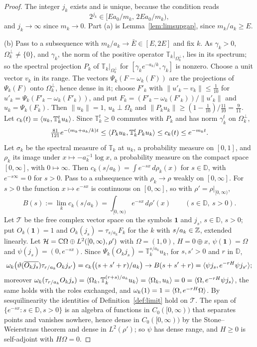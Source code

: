 \begin{proof}
The integer $j_k$ exists and is unique, because the condition reads
\[
2^{j_k}\in[Ea_0/m_k,\,2Ea_0/m_k),
\]
and $j_k\to\infty$ since $m_k\to0$. Part (a) is
Lemma~\ref{lem:limsupgap}, since $m_k/a_k\ge E$.

(b) Pass to a subsequence with $m_k/a_k\to\bar E\in[E,2E]$ and fix $k$. As
$\gamma_k>0$, $\Omega_k^\perp\ne\{0\}$, and $\gamma_k$, the norm of the positive
operator $\mathbb T_k|_{\Omega_k^\perp}$, lies in its spectrum; so the spectral
projection $P_k$ of $\mathbb T_k|_{\Omega_k^\perp}$ for $[\gamma_ke^{-a_k/k},
\gamma_k]$ is nonzero. Choose a unit vector $v_k$ in its range. The vectors
$\Psi_k(F-\omega_k(F))$ are the projections of $\Psi_k(F)$ onto $\Omega_k^\perp$,
hence dense in it; choose $F'_k$ with $\|u'_k-v_k\|\le\frac1{10}$ for $u'_k=
\Psi_k(F'_k-\omega_k(F'_k))$, and put $F_k=(F'_k-\omega_k(F'_k))/\|u'_k\|$ and
$u_k=\Psi_k(F_k)$. Then $\|u_k\|=1$, $u_k\perp\Omega_k$ and $\|P_ku_k\|\ge(1-
\frac1{10})/\frac{11}{10}=\frac9{11}$. Let $c_k(t)=\langle u_k,\mathbb T_k^tu_k\rangle$.
Since $\mathbb T_k^t\ge0$ commutes with $P_k$ and has norm $\gamma_k^t$ on
$\Omega_k^\perp$,
\begin{equation}\label{eq:twosided}
\tfrac{81}{121}e^{-(m_k+a_k/k)t}\le\langle P_ku_k,\mathbb T_k^tP_ku_k\rangle\le c_k(t)\le
e^{-m_kt}.
\end{equation}
Let $\sigma_k$ be the spectral measure of $\mathbb T_k$ at $u_k$, a probability
measure on $[0,1]$, and $\rho_k$ its image under $x\mapsto-a_k^{-1}\log x$, a
probability measure on the compact space $[0,\infty]$, with $0\mapsto\infty$.
Then $c_k(s/a_k)=\int e^{-sx}\,d\rho_k(x)$ for $s\in\mathbb D$, with $e^{-s\infty}
=0$ for $s>0$. Pass to a subsequence with $\rho_k\to\rho$ weakly on $[0,\infty]$.
For $s>0$ the function $x\mapsto e^{-sx}$ is continuous on $[0,\infty]$, so with
$\rho'=\rho|_{[0,\infty)}$,
\[
B(s):=\lim_kc_k(s/a_k)=\int_{[0,\infty)}e^{-sx}\,d\rho'(x)\qquad(s\in\mathbb D,
\ s>0).
\]
Let $\mathcal T$ be the free complex vector space on the symbols $\mathbf1$ and
$j_s$, $s\in\mathbb D$, $s>0$; put $O_k(\mathbf1)=1$ and $O_k(j_s)=\tau_{s/a_k}
F_k$ for the $k$ with $s/a_k\in\mathbb{Z}$, extended linearly. Let $\mathcal H=\mathbb{C}\Omega
\oplus L^2([0,\infty),\rho')$ with $\Omega=(1,0)$, $H=0\oplus x$, $\psi(\mathbf1)
=\Omega$ and $\psi(j_s)=(0,e^{-sx})$. Since $\Psi_k(O_kj_s)=\mathbb T_k^{s/a_k}
u_k$, for $s,s'>0$ and $r$ in $\mathbb D$,
\[
\omega_k\bigl(\vartheta(\overline{O_kj_s})\tau_{r/a_k}O_kj_{s'}\bigr)=c_k\bigl((s
+s'+r)/a_k\bigr)\to B(s+s'+r)=\langle \psi j_s,e^{-rH}\psi j_{s'}\rangle;
\]
moreover $\omega_k(\tau_{r/a_k}O_kj_s)=\langle \Omega_k,\mathbb T_k^{(r+s)/a_k}u_k\rangle=
\langle \Omega_k,u_k\rangle=0=\langle \Omega,e^{-rH}\psi j_s\rangle$, the same holds with the roles
exchanged, and $\omega_k(1)=1=\langle \Omega,e^{-rH}\Omega\rangle$. By sesquilinearity the
identities of Definition~\ref{def:limit} hold on $\mathcal T$. The span of
$\{e^{-sx}:s\in\mathbb D,s>0\}$ is an algebra of functions in $C_0([0,\infty))$
that separates points and vanishes nowhere, hence dense in $C_0([0,\infty))$ by
the Stone--Weierstrass theorem and dense in $L^2(\rho')$; so $\psi$ has dense
range, and $H\ge0$ is self-adjoint with $H\Omega=0$.


\end{proof}
